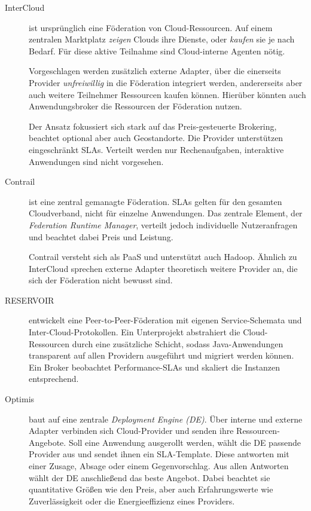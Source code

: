 

\begin{description}	
	
	
	\item[InterCloud] ist ursprünglich eine Föderation von Cloud-Ressourcen. Auf einem zentralen Marktplatz \emph{zeigen} Clouds ihre Dienste, oder \emph{kaufen} sie je nach Bedarf. Für diese aktive Teilnahme sind Cloud-interne Agenten nötig.
	
	Vorgeschlagen werden zusätzlich externe Adapter, über die einerseits Provider \emph{unfreiwillig} in die Föderation integriert werden, andererseits aber auch weitere Teilnehmer Ressourcen kaufen können. Hierüber könnten auch Anwendungsbroker die Ressourcen der Föderation nutzen.
	
	Der Ansatz fokussiert sich stark auf das Preis-gesteuerte Brokering, beachtet optional aber auch Geostandorte. Die Provider unterstützen eingeschränkt SLAs. Verteilt werden nur Rechenaufgaben, interaktive Anwendungen sind nicht vorgesehen.
	
	
	\item[Contrail] ist eine zentral gemanagte Föderation. SLAs gelten für den gesamten Cloudverband, nicht für einzelne Anwendungen. Das zentrale Element, der \emph{Federation Runtime Manager}, verteilt jedoch individuelle Nutzeranfragen und beachtet dabei Preis und Leistung.
	

	Contrail versteht sich als PaaS und unterstützt auch Hadoop. Ähnlich zu InterCloud sprechen externe Adapter theoretisch weitere Provider an, die sich der Föderation nicht bewusst sind.
		
	
	\item[RESERVOIR] entwickelt eine Peer-to-Peer-Föderation mit eigenen Service-Schemata und Inter-Cloud-Protokollen. Ein Unterprojekt abstrahiert die Cloud-Ressourcen durch eine zusätzliche Schicht, sodass Java-Anwendungen transparent auf allen Providern ausgeführt und migriert werden können. Ein Broker beobachtet Performance-SLAs und skaliert die Instanzen entsprechend.
	
	
	\item[Optimis] baut auf eine zentrale \emph{Deployment Engine (DE)}. Über interne und externe Adapter verbinden sich Cloud-Provider und senden ihre Ressourcen-Angebote. Soll eine Anwendung ausgerollt werden, wählt die DE passende Provider aus und sendet ihnen ein SLA-Template. Diese antworten mit einer Zusage, Absage oder einem Gegenvorschlag. Aus allen Antworten wählt der DE anschließend das beste Angebot. Dabei beachtet sie quantitative Größen wie den Preis, aber auch Erfahrungswerte wie Zuverlässigkeit oder die Energieeffizienz eines Providers.
	

\end{description}
